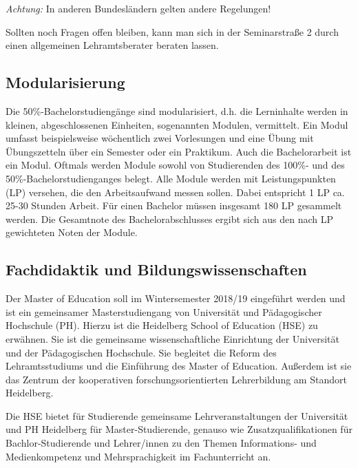\emph{Achtung:} In anderen Bundesländern gelten andere Regelungen!

Sollten noch Fragen offen bleiben, kann man sich in der Seminarstraße 2 durch einen allgemeinen Lehramtsberater beraten lassen. 



\subsection{Modularisierung}
Die 50\%-Bachelorstudiengänge sind modularisiert, d.h. die Lerninhalte werden in kleinen, abgeschlossenen Einheiten, sogenannten Modulen, vermittelt. Ein Modul umfasst beispielsweise wöchentlich zwei Vorlesungen und eine Übung mit Übungszetteln über ein Semester oder ein Praktikum. Auch die Bachelorarbeit ist ein Modul. Oftmals werden Module sowohl von Studierenden des 100\%- und des 50\%-Bachelorstudienganges belegt. Alle Module werden mit Leistungspunkten (\gls{LP}) versehen, die den Arbeitsaufwand messen sollen. Dabei entspricht 1 \gls{LP} ca. 25-30 Stunden Arbeit. Für einen Bachelor müssen insgesamt 180 \gls{LP} gesammelt werden. Die Gesamtnote des Bachelorabschlusses ergibt sich aus den nach \gls{LP} gewichteten Noten der Module.

\subsection{Fachdidaktik und Bildungswissenschaften}
Der Master of Education soll im Wintersemester 2018/19 eingeführt werden und ist ein gemeinsamer Masterstudiengang von Universität und Pädagogischer Hochschule (PH). Hierzu ist die Heidelberg School of  Education (HSE) zu erwähnen. Sie ist die gemeinsame wissenschaftliche Einrichtung der Universität und der Pädagogischen Hochschule. Sie begleitet die Reform des Lehramtsstudiums und die Einführung des Master of Education. Außerdem ist sie das Zentrum der kooperativen forschungsorientierten Lehrerbildung am Standort Heidelberg. 

Die HSE bietet für Studierende gemeinsame Lehrveranstaltungen der Universität und PH Heidelberg für Master-Studierende, genauso wie Zusatzqualifikationen für Bachlor-Studierende und Lehrer/innen zu den Themen Informations- und Medienkompetenz und Mehrsprachigkeit im Fachunterricht an. 


